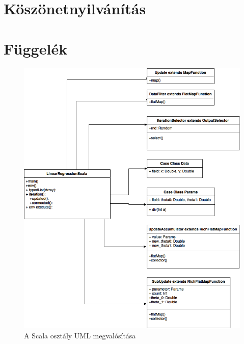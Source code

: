 \documentclass[a4paper,12pt]{article}
\begin{document}
\section{Köszönetnyilvánítás}	

\section{Függelék}	

\begin{figure}[H]
\centering
\includegraphics[width=130mm]{img/scala.png}
\caption{A Scala osztály UML megvalósítása} \label{}
\end{figure}
\end{document}

